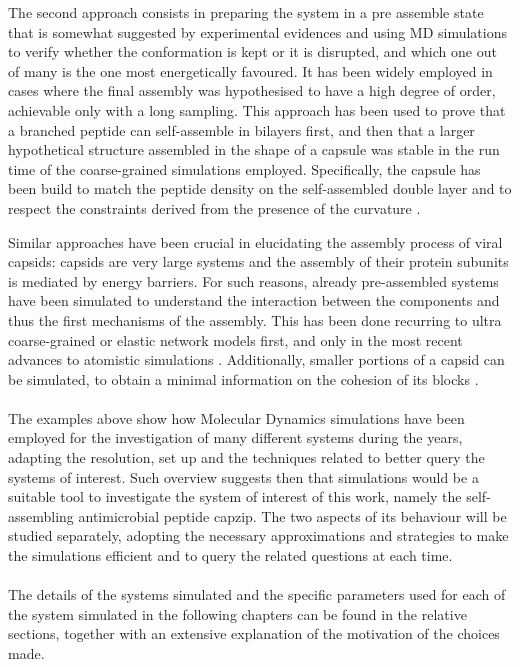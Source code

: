 The second approach consists in preparing the system in a pre assemble state that is somewhat suggested by experimental evidences and using MD simulations to verify whether the conformation is kept or it is disrupted, and which one out of many is the one most energetically favoured. It has been widely employed in cases where the final assembly was hypothesised to have a high degree of order, achievable only with a long sampling. 
%
This approach has been used to prove that a branched peptide can self-assemble in bilayers first, and then that a larger hypothetical structure assembled in the shape of a capsule was stable in the run time of the coarse-grained simulations employed. Specifically, the capsule has been build to match the peptide density on the self-assembled double layer and to respect the constraints derived from the presence of the curvature \citep{Gudlur2012}.

Similar approaches have been crucial in elucidating the assembly process of viral capsids: capsids are very large systems and the assembly of their protein subunits is mediated by energy barriers. For such reasons, already pre-assembled systems have been simulated to understand the interaction between the components and thus the first mechanisms of the assembly. This has been done recurring to ultra coarse-grained or elastic network models \citep{Grime2016} first, and only in the most recent advances to atomistic simulations \citep{Perilla2016,Hadden2018}. Additionally, smaller portions of a capsid can be simulated, to obtain a minimal information on the cohesion of its blocks \citep{AbiMansour2014}.


\paragraph{}
The examples above show how Molecular Dynamics simulations have been employed for the investigation of many different systems during the years, adapting the resolution, set up and the techniques related to better query the systems of interest. Such overview suggests then that simulations would be a suitable tool to investigate the system of interest of this work, namely the self-assembling antimicrobial peptide capzip. The two aspects of its behaviour will be studied separately, adopting the necessary approximations and strategies to make the simulations efficient and to query the related questions at each time.

\paragraph{}
The details of the systems simulated and the specific parameters used for each of the system simulated in the following chapters can be found in the relative sections, together with an extensive explanation of the motivation of the choices made.